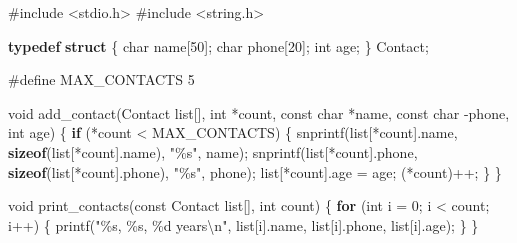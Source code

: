 \documentclass[
  letterpaper,
  DIV=11,
  numbers=noendperiod]{scrreprt}
\newenvironment{Shaded}{\begin{snugshade}}{\end{snugshade}}
\newcommand{\ControlFlowTok}[1]{\textcolor[rgb]{0.00,0.23,0.31}{\textbf{#1}}}
\newcommand{\DataTypeTok}[1]{\textcolor[rgb]{0.68,0.00,0.00}{#1}}
\newcommand{\DecValTok}[1]{\textcolor[rgb]{0.68,0.00,0.00}{#1}}
\newcommand{\ImportTok}[1]{\textcolor[rgb]{0.00,0.46,0.62}{#1}}
\newcommand{\KeywordTok}[1]{\textcolor[rgb]{0.00,0.23,0.31}{\textbf{#1}}}
\newcommand{\NormalTok}[1]{\textcolor[rgb]{0.00,0.23,0.31}{#1}}
\newcommand{\OperatorTok}[1]{\textcolor[rgb]{0.37,0.37,0.37}{#1}}
\newcommand{\PreprocessorTok}[1]{\textcolor[rgb]{0.68,0.00,0.00}{#1}}
\newcommand{\SpecialCharTok}[1]{\textcolor[rgb]{0.37,0.37,0.37}{#1}}
\newcommand{\StringTok}[1]{\textcolor[rgb]{0.13,0.47,0.30}{#1}}
\begin{document}
\begin{Shaded}
\begin{Highlighting}[]
\PreprocessorTok{\#include }\ImportTok{\textless{}stdio.h\textgreater{}}
\PreprocessorTok{\#include }\ImportTok{\textless{}string.h\textgreater{}}

\KeywordTok{typedef} \KeywordTok{struct} \OperatorTok{\{}
    \DataTypeTok{char}\NormalTok{ name}\OperatorTok{[}\DecValTok{50}\OperatorTok{];}
    \DataTypeTok{char}\NormalTok{ phone}\OperatorTok{[}\DecValTok{20}\OperatorTok{];}
    \DataTypeTok{int}\NormalTok{ age}\OperatorTok{;}
\OperatorTok{\}}\NormalTok{ Contact}\OperatorTok{;}

\PreprocessorTok{\#define MAX\_CONTACTS }\DecValTok{5}

\DataTypeTok{void}\NormalTok{ add\_contact}\OperatorTok{(}\NormalTok{Contact list}\OperatorTok{[],} \DataTypeTok{int} \OperatorTok{*}\NormalTok{count}\OperatorTok{,} \DataTypeTok{const} \DataTypeTok{char} \OperatorTok{*}\NormalTok{name}\OperatorTok{,} \DataTypeTok{const} \DataTypeTok{char} \OperatorTok{{-}}\NormalTok{phone}\OperatorTok{,} \DataTypeTok{int}\NormalTok{ age}\OperatorTok{)} \OperatorTok{\{}
    \ControlFlowTok{if} \OperatorTok{(*}\NormalTok{count }\OperatorTok{\textless{}}\NormalTok{ MAX\_CONTACTS}\OperatorTok{)} \OperatorTok{\{}
\NormalTok{        snprintf}\OperatorTok{(}\NormalTok{list}\OperatorTok{[*}\NormalTok{count}\OperatorTok{].}\NormalTok{name}\OperatorTok{,} \KeywordTok{sizeof}\OperatorTok{(}\NormalTok{list}\OperatorTok{[*}\NormalTok{count}\OperatorTok{].}\NormalTok{name}\OperatorTok{),} \StringTok{"}\SpecialCharTok{\%s}\StringTok{"}\OperatorTok{,}\NormalTok{ name}\OperatorTok{);}
\NormalTok{        snprintf}\OperatorTok{(}\NormalTok{list}\OperatorTok{[*}\NormalTok{count}\OperatorTok{].}\NormalTok{phone}\OperatorTok{,} \KeywordTok{sizeof}\OperatorTok{(}\NormalTok{list}\OperatorTok{[*}\NormalTok{count}\OperatorTok{].}\NormalTok{phone}\OperatorTok{),} \StringTok{"}\SpecialCharTok{\%s}\StringTok{"}\OperatorTok{,}\NormalTok{ phone}\OperatorTok{);}
\NormalTok{        list}\OperatorTok{[*}\NormalTok{count}\OperatorTok{].}\NormalTok{age }\OperatorTok{=}\NormalTok{ age}\OperatorTok{;}
        \OperatorTok{(*}\NormalTok{count}\OperatorTok{)++;}
    \OperatorTok{\}}
\OperatorTok{\}}

\DataTypeTok{void}\NormalTok{ print\_contacts}\OperatorTok{(}\DataTypeTok{const}\NormalTok{ Contact list}\OperatorTok{[],} \DataTypeTok{int}\NormalTok{ count}\OperatorTok{)} \OperatorTok{\{}
    \ControlFlowTok{for} \OperatorTok{(}\DataTypeTok{int}\NormalTok{ i }\OperatorTok{=} \DecValTok{0}\OperatorTok{;}\NormalTok{ i }\OperatorTok{\textless{}}\NormalTok{ count}\OperatorTok{;}\NormalTok{ i}\OperatorTok{++)} \OperatorTok{\{}
\NormalTok{        printf}\OperatorTok{(}\StringTok{"}\SpecialCharTok{\%s}\StringTok{, }\SpecialCharTok{\%s}\StringTok{, }\SpecialCharTok{\%d}\StringTok{ years}\SpecialCharTok{\textbackslash{}n}\StringTok{"}\OperatorTok{,}\NormalTok{ list}\OperatorTok{[}\NormalTok{i}\OperatorTok{].}\NormalTok{name}\OperatorTok{,}\NormalTok{ list}\OperatorTok{[}\NormalTok{i}\OperatorTok{].}\NormalTok{phone}\OperatorTok{,}\NormalTok{ list}\OperatorTok{[}\NormalTok{i}\OperatorTok{].}\NormalTok{age}\OperatorTok{);}
    \OperatorTok{\}}
\OperatorTok{\}}


\end{Highlighting}
\end{Shaded}
\end{document}
